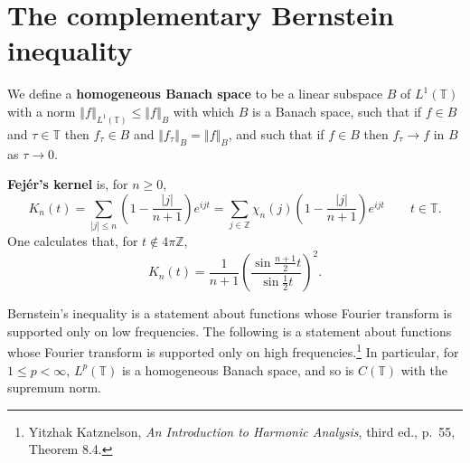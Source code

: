 \documentclass{article}
\newcommand{\norm}[1]{\left\Vert #1 \right\Vert}
\theoremstyle{definition}
\begin{document}
\section{The complementary Bernstein inequality}
We define a \textbf{homogeneous Banach space} to be a linear subspace $B$
of $L^1(\mathbb{T})$ with a norm $\norm{f}_{L^1(\mathbb{T})} \leq
\norm{f}_B$ with which $B$ is a Banach space,
such that if $f \in B$ and $\tau \in \mathbb{T}$ then $f_\tau \in B$ and $\norm{f_\tau}_B = \norm{f}_B$,
and such that if $f \in B$ then $f_\tau \to f$ in $B$ as $\tau \to 0$. 

 \textbf{Fej\'er's kernel} is, for $n \geq 0$,
\[
K_n(t) = \sum_{|j| \leq n} \left(1-\frac{|j|}{n+1} \right) e^{ijt}=
\sum_{j \in \mathbb{Z}} \chi_n(j) \left(1-\frac{|j|}{n+1} \right) e^{ijt} \qquad t \in \mathbb{T}.
\]
One calculates that, for $t \not \in 4\pi \mathbb{Z}$,
\[
K_n(t) = \frac{1}{n+1} \left( \frac{\sin \frac{n+1}{2}t}{\sin \frac{1}{2}t} \right)^2.
\]

Bernstein's inequality is a statement about functions whose Fourier transform is supported only on low frequencies. The following is a statement
about functions whose Fourier transform is supported only on high frequencies.\footnote{Yitzhak Katznelson, {\em An Introduction to Harmonic
Analysis}, third ed., p.~55, Theorem 8.4.} In particular, for $1 \leq p < \infty$, $L^p(\mathbb{T})$ is a homogeneous Banach space, and
so is $C(\mathbb{T})$ with the supremum norm.
\end{document}
